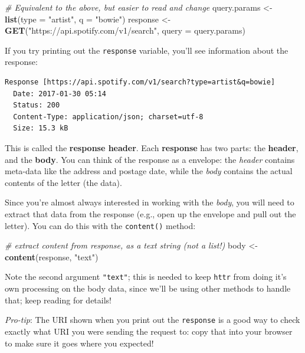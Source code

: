 \documentclass[]{book}
\newenvironment{Shaded}{\begin{snugshade}}{\end{snugshade}}
\newcommand{\KeywordTok}[1]{\textcolor[rgb]{0.13,0.29,0.53}{\textbf{#1}}}
\newcommand{\DataTypeTok}[1]{\textcolor[rgb]{0.13,0.29,0.53}{#1}}
\newcommand{\StringTok}[1]{\textcolor[rgb]{0.31,0.60,0.02}{#1}}
\newcommand{\CommentTok}[1]{\textcolor[rgb]{0.56,0.35,0.01}{\textit{#1}}}
\newcommand{\NormalTok}[1]{#1}
\theoremstyle{definition}
\theoremstyle{definition}
\theoremstyle{remark}
\begin{document}
\begin{Shaded}
\begin{Highlighting}[]
\CommentTok{# Equivalent to the above, but easier to read and change}
\NormalTok{query.params <-}\StringTok{ }\KeywordTok{list}\NormalTok{(}\DataTypeTok{type =} \StringTok{"artist"}\NormalTok{, }\DataTypeTok{q =} \StringTok{"bowie"}\NormalTok{)}
\NormalTok{response <-}\StringTok{ }\KeywordTok{GET}\NormalTok{(}\StringTok{"https://api.spotify.com/v1/search"}\NormalTok{, }\DataTypeTok{query =}\NormalTok{ query.params)}
\end{Highlighting}
\end{Shaded}

If you try printing out the \texttt{response} variable, you'll see
information about the response:

\begin{verbatim}
Response [https://api.spotify.com/v1/search?type=artist&q=bowie]
  Date: 2017-01-30 05:14
  Status: 200
  Content-Type: application/json; charset=utf-8
  Size: 15.3 kB
\end{verbatim}

This is called the \textbf{response header}. Each \textbf{response} has
two parts: the \textbf{header}, and the \textbf{body}. You can think of
the response as a envelope: the \emph{header} contains meta-data like
the address and postage date, while the \emph{body} contains the actual
contents of the letter (the data).

Since you're almost always interested in working with the \emph{body},
you will need to extract that data from the response (e.g., open up the
envelope and pull out the letter). You can do this with the
\texttt{content()} method:

\begin{Shaded}
\begin{Highlighting}[]
\CommentTok{# extract content from response, as a text string (not a list!)}
\NormalTok{body <-}\StringTok{ }\KeywordTok{content}\NormalTok{(response, }\StringTok{"text"}\NormalTok{)}
\end{Highlighting}
\end{Shaded}

Note the second argument \texttt{"text"}; this is needed to keep
\texttt{httr} from doing it's own processing on the body data, since
we'll be using other methods to handle that; keep reading for details!

\emph{Pro-tip}: The URI shown when you print out the \texttt{response}
is a good way to check exactly what URI you were sending the request to:
copy that into your browser to make sure it goes where you expected!
\end{document}

